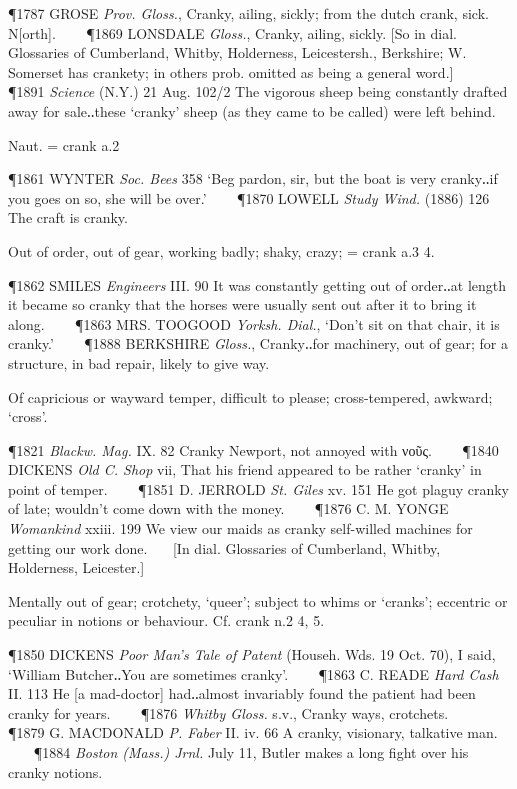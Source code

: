 \begin{description}[wide, labelwidth=!, labelindent=0pt]
\begin{myenumerate}
\P 1787 GROSE  \textit{Prov. Gloss.}, Cranky, ailing, sickly; from the dutch crank, sick. N[orth].    
\P 1869 LONSDALE  \textit{Gloss.}, Cranky, ailing, sickly. [So in dial. Glossaries of Cumberland, Whitby, Holderness, Leicestersh., Berkshire; W. Somerset has crankety; in others prob. omitted as being a general word.]    
\P 1891  \textit{Science} (N.Y.) 21 Aug. 102/2 The vigorous sheep being constantly drafted away for sale‥these ‘cranky’ sheep (as they came to be called) were left behind.

 Naut. = crank a.2

\P 1861 WYNTER  \textit{Soc. Bees} 358 ‘Beg pardon, sir, but the boat is very cranky‥if you goes on so, she will be over.’    
\P 1870 LOWELL  \textit{Study Wind.} (1886) 126 The craft is cranky.

 Out of order, out of gear, working badly; shaky, crazy; = crank a.3 4.

\P 1862 SMILES  \textit{Engineers} III. 90 It was constantly getting out of order‥at length it became so cranky that the horses were usually sent out after it to bring it along.    
\P 1863 MRS. TOOGOOD  \textit{Yorksh. Dial.}, ‘Don't sit on that chair, it is cranky.’    
\P 1888 BERKSHIRE  \textit{Gloss.}, Cranky‥for machinery, out of gear; for a structure, in bad repair, likely to give way.

 Of capricious or wayward temper, difficult to please; cross-tempered, awkward; ‘cross’.

\P 1821  \textit{Blackw. Mag.} IX. 82 Cranky Newport, not annoyed with νοῦς.    
\P 1840 DICKENS  \textit{Old C. Shop} vii, That his friend appeared to be rather ‘cranky’ in point of temper.    
\P 1851 D. JERROLD  \textit{St. Giles} xv. 151 He got plaguy cranky of late; wouldn't come down with the money.    
\P 1876 C. M. YONGE  \textit{Womankind} xxiii. 199 We view our maids as cranky self-willed machines for getting our work done.    [In dial. Glossaries of Cumberland, Whitby, Holderness, Leicester.]

 Mentally out of gear; crotchety, ‘queer’; subject to whims or ‘cranks’; eccentric or peculiar in notions or behaviour. Cf. crank n.2 4, 5.

\P 1850 DICKENS  \textit{Poor Man's Tale of Patent} (Househ. Wds. 19 Oct. 70), I said, ‘William Butcher‥You are sometimes cranky’.    
\P 1863 C. READE  \textit{Hard Cash} II. 113 He [a mad-doctor] had‥almost invariably found the patient had been cranky for years.    
\P 1876  \textit{Whitby Gloss.} s.v., Cranky ways, crotchets.    
\P 1879 G. MACDONALD  \textit{P. Faber} II. iv. 66 A cranky, visionary, talkative man.    
\P 1884 \textit{Boston  (Mass.) Jrnl.} July 11, Butler makes a long fight over his cranky notions.


\end{myenumerate}
\end{description}
